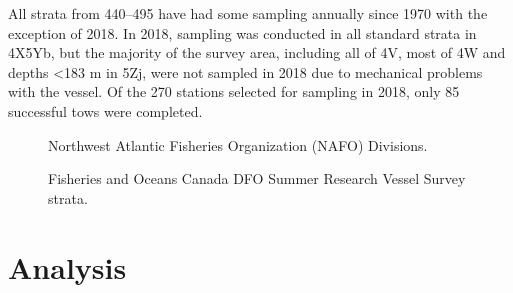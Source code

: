 \documentclass[11pt]{book}
\begin{document}
All strata from 440--495 have had some sampling annually since 1970 with the exception of 2018. In 2018, sampling was conducted in all standard strata in 4X5Yb, but the majority of the survey area, including all of 4V, most of 4W and depths \textless183 m in 5Zj, were not sampled in 2018 due to mechanical problems with the vessel. Of the 270 stations selected for sampling in 2018, only 85 successful tows were completed.


\begin{figure}[htb]

{\centering {} 

}

\caption{Northwest Atlantic Fisheries Organization (NAFO) Divisions.}\label{fig:1-map-NAFO}
\end{figure}

\begin{figure}[htb]

{\centering {} 

}

\caption{Fisheries and Oceans Canada DFO Summer Research Vessel Survey strata.}\label{fig:2-map-RVstrata}
\end{figure}
\hypertarget{analysis}{%
\section{Analysis}\label{analysis}}
\end{document}

